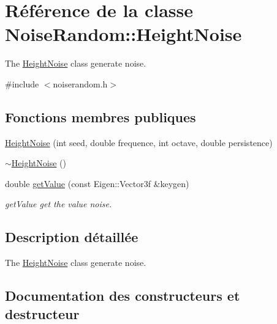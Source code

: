 \hypertarget{class_noise_random_1_1_height_noise}{}\section{Référence de la classe Noise\+Random\+:\+:Height\+Noise}
\label{class_noise_random_1_1_height_noise}


The \hyperlink{class_noise_random_1_1_height_noise}{Height\+Noise} class generate noise.  




{\ttfamily \#include $<$noiserandom.\+h$>$}

\subsection*{Fonctions membres publiques}
\begin{DoxyCompactItemize}
\item 
\hyperlink{class_noise_random_1_1_height_noise_ab166c1a0af9e801a289d33a6d7bd2292}{Height\+Noise} (int seed, double frequence, int octave, double persistence)
\item 
\hyperlink{class_noise_random_1_1_height_noise_a85d91613d7cc310e928f136680afff22}{$\sim$\+Height\+Noise} ()
\item 
double \hyperlink{class_noise_random_1_1_height_noise_a0be08d8bcaef1c76a80c45898355d236}{get\+Value} (const Eigen\+::\+Vector3f \&keygen)
\begin{DoxyCompactList}\small\item\em get\+Value get the value noise. \end{DoxyCompactList}\end{DoxyCompactItemize}


\subsection{Description détaillée}
The \hyperlink{class_noise_random_1_1_height_noise}{Height\+Noise} class generate noise. 

\subsection{Documentation des constructeurs et destructeur}
\mbox{\label{class_noise_random_1_1_height_noise_ab166c1a0af9e801a289d33a6d7bd2292}} 
